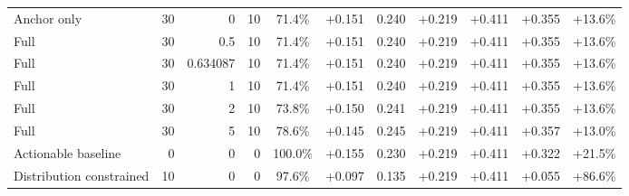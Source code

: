 \begin{table}[htbp]
\begin{tabular}{lrrrccccccc}
Anchor only & 30 & 0 & 10 & 71.4\% & +0.151 & 0.240 & +0.219 & +0.411 & +0.355 & +13.6\% \\
Full & 30 & 0.5 & 10 & 71.4\% & +0.151 & 0.240 & +0.219 & +0.411 & +0.355 & +13.6\% \\
Full & 30 & 0.634087 & 10 & 71.4\% & +0.151 & 0.240 & +0.219 & +0.411 & +0.355 & +13.6\% \\
Full & 30 & 1 & 10 & 71.4\% & +0.151 & 0.240 & +0.219 & +0.411 & +0.355 & +13.6\% \\
Full & 30 & 2 & 10 & 73.8\% & +0.150 & 0.241 & +0.219 & +0.411 & +0.355 & +13.6\% \\
Full & 30 & 5 & 10 & 78.6\% & +0.145 & 0.245 & +0.219 & +0.411 & +0.357 & +13.0\% \\
Actionable baseline & 0 & 0 & 0 & 100.0\% & +0.155 & 0.230 & +0.219 & +0.411 & +0.322 & +21.5\% \\
Distribution constrained & 10 & 0 & 0 & 97.6\% & +0.097 & 0.135 & +0.219 & +0.411 & +0.055 & +86.6\% \\
\bottomrule
\end{tabular}
\end{table}